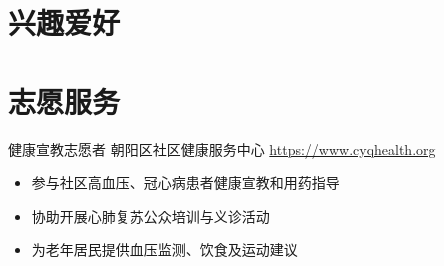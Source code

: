 \documentclass[a4paper, serif, 10pt]{moderncv}
\begin{document}
\section{兴趣爱好}

\section{志愿服务}

        {健康宣教志愿者}
        {朝阳区社区健康服务中心}
        {\url{https://www.cyqhealth.org}}
        {}
        {\begin{itemize}
\item 参与社区高血压、冠心病患者健康宣教和用药指导
\item 协助开展心肺复苏公众培训与义诊活动
\item 为老年居民提供血压监测、饮食及运动建议
\end{itemize}}
    
\end{document}

